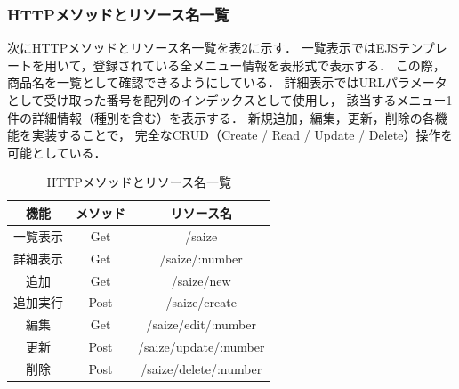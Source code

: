 \documentclass[uplatex,dvipdfmx]{jsarticle}
\begin{document}
\subsubsection{HTTPメソッドとリソース名一覧}
次にHTTPメソッドとリソース名一覧を表2に示す．
一覧表示ではEJSテンプレートを用いて，登録されている全メニュー情報を表形式で表示する．
この際，商品名を一覧として確認できるようにしている．
詳細表示ではURLパラメータとして受け取った番号を配列のインデックスとして使用し，
該当するメニュー1件の詳細情報（種別を含む）を表示する．
新規追加，編集，更新，削除の各機能を実装することで，
完全なCRUD（Create / Read / Update / Delete）操作を可能としている．

\begin{table}[H]
    \centering
    \caption{HTTPメソッドとリソース名一覧}
    \label{tab:pulse_comparison}
    \setlength{\extrarowheight}{3pt} 
    \begin{tabular}{|c|c|c|}
        \hline
        機能 & メソッド & リソース名 \\
        \hline
        一覧表示 & Get & /saize \\
        \hline
        詳細表示 & Get & /saize/:number \\
        \hline
        追加 & Get & /saize/new \\
        \hline
        追加実行 & Post & /saize/create \\
        \hline
        編集 & Get & /saize/edit/:number \\
        \hline
        更新 & Post & /saize/update/:number \\
        \hline
        削除 & Post & /saize/delete/:number \\
        \hline
     \end{tabular}
\end{table}
\end{document}
